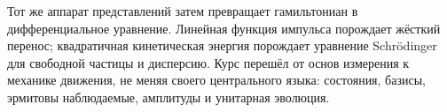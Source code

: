 Тот же аппарат представлений затем превращает гамильтониан в дифференциальное уравнение. Линейная функция импульса порождает жёсткий перенос; квадратичная кинетическая энергия порождает уравнение Schr\"odinger для свободной частицы и дисперсию. Курс перешёл от основ измерения к механике движения, не меняя своего центрального языка: состояния, базисы, эрмитовы наблюдаемые, амплитуды и унитарная эволюция.
